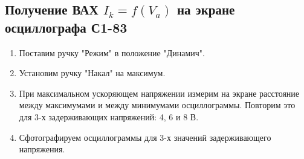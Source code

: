 \documentclass[a4paper]{article}
\begin{document}
\subsection{Получение ВАХ $I_k = f(V_a)$ на экране осциллографа С1-83}

\begin{enumerate}
	\item Поставим ручку "Режим" в положение "Динамич".
	\item Установим ручку "Накал" на максимум.
	\item При максимальном ускоряющем напряжении измерим на экране расстояние между максимумами
	и между минимумами осциллограммы. Повторим это для 3-х задерживающих напряжений: 4, 6 и 8 В.
	\item Сфотографируем осциллограммы для 3-х значений задерживающего напряжения.
	

\end{enumerate}
\end{document}
